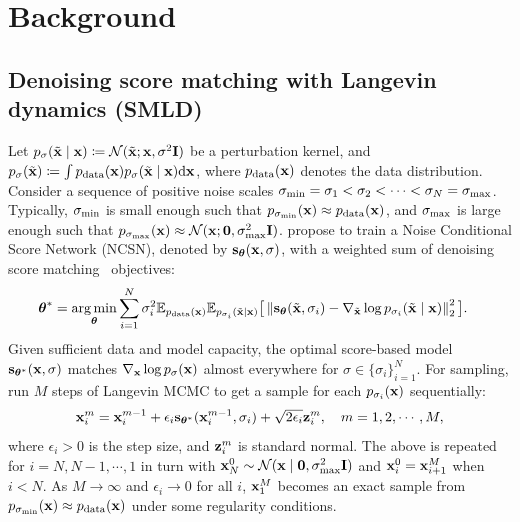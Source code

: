 \section{Background}
\subsection{Denoising score matching with Langevin dynamics (SMLD)}\label{sec:ncsn}
Let $p_{\sigma}(\tilde{\mathbf{x}} \mid \mathbf{x}) \coloneqq \mathcal{N}(\tilde{\mathbf{x}}; \mathbf{x}, \sigma^2 \mathbf{I})$ be a perturbation kernel, and $p_{\sigma}(\tilde{\mathbf{x}}) \coloneqq \int p_{\mathrm{data}}(\mathbf{x}) p_{\sigma}(\tilde{\mathbf{x}} \mid \mathbf{x}) \mathrm{d} \mathbf{x}$, where $p_{\mathrm{data}}(\mathbf{x})$ denotes the data distribution. Consider a sequence of positive noise scales $\sigma_{\text{min}} = \sigma_1 < \sigma_2 < \cdots < \sigma_{N} = \sigma_{\text{max}}$. Typically, $\sigma_{\text{min}}$ is small enough such that $p_{\sigma_{\text{min}}}(\mathbf{x}) \approx p_{\mathrm{data}}(\mathbf{x})$, and $\sigma_{\text{max}}$ is large enough such that $p_{\sigma_{\text{max}}}(\mathbf{x}) \approx \mathcal{N}(\mathbf{x}; \mathbf{0}, \sigma_{\text{max}}^2 \mathbf{I})$. \citet{song2019generative} propose to train a Noise Conditional Score Network (NCSN), denoted by $\mathbf{s}_{\boldsymbol{\theta}}(\mathbf{x}, \sigma)$, with a weighted sum of denoising score matching~\citep{vincent2011connection} objectives:
\begin{align}
{\boldsymbol{\theta}}^* &= \operatorname*{arg\,min}_{\boldsymbol{\theta}}
   \sum_{i=1}^{N} \sigma_i^2  \mathbb{E}_{p_{\mathrm{data}}(\mathbf{x})}\mathbb{E}_{p_{\sigma_i}(\tilde{\mathbf{x}} \mid \mathbf{x})}\big[\left\lVert \mathbf{s}_{\boldsymbol{\theta}}(\tilde{\mathbf{x}}, \sigma_i) - \nabla_{\tilde{\mathbf{x}}} \log p_{\sigma_i}(\tilde{\mathbf{x}} \mid \mathbf{x})\right\rVert_2^2 \big]. \label{eqn:ncsn_obj}
\end{align}
Given sufficient data and model capacity, the optimal score-based model $\mathbf{s}_{{\boldsymbol{\theta}}^*}(\mathbf{x}, \sigma)$ matches $\nabla_{\mathbf{x}} \log p_{\sigma}(\mathbf{x})$ almost everywhere for $\sigma \in \{\sigma_i\}_{i=1}^{N}$. For sampling, \citet{song2019generative} run $M$ steps of Langevin MCMC to get a sample for each $p_{\sigma_i}(\mathbf{x})$ sequentially:
\begin{align}
    \mathbf{x}_i^m = \mathbf{x}_i^{m-1} + \epsilon_i \mathbf{s}_{{\boldsymbol{\theta}}^*}(\mathbf{x}_i^{m-1}, \sigma_{i}) + \sqrt{2\epsilon_i} \mathbf{z}_{i}^m,\quad m=1,2,\cdots, M,\label{eqn:langevin}
\end{align}
where $\epsilon_i > 0$ is the step size, and $\mathbf{z}_i^m$ is standard normal. %
The above is repeated for $i=N, N-1, \cdots, 1$ in turn with $\mathbf{x}_{N}^0 \sim \mathcal{N}(\mathbf{x} \mid \mathbf{0}, \sigma_{\text{max}}^2 \mathbf{I})$ and $\mathbf{x}_i^0 = \mathbf{x}_{i+1}^{M}$ when $i < N$. As $M \to \infty$ and $\epsilon_i \to 0$ for all $i$, $\mathbf{x}_1^M$ becomes an exact sample from $p_{\sigma_{\text{min}}}(\mathbf{x}) \approx p_{\mathrm{data}}(\mathbf{x})$ under some regularity conditions.

